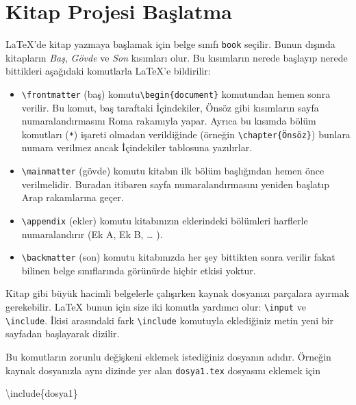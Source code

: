 \documentclass[
  10pt,
]{scrbook}
\newenvironment{Shaded}{}{}
\newcommand{\BuiltInTok}[1]{#1}
\newcommand{\ExtensionTok}[1]{#1}
\newcommand{\NormalTok}[1]{#1}
\providecommand{\tightlist}{%
  \setlength{\itemsep}{0pt}\setlength{\parskip}{0pt}}
\theoremstyle{definition}
\theoremstyle{definition}
\theoremstyle{definition}
\theoremstyle{definition}
\theoremstyle{remark}
\begin{document}
\hypertarget{kitap-projesi-baux15flatma}{%
\section{Kitap Projesi Başlatma}\label{kitap-projesi-baux15flatma}}

LaTeX'de kitap yazmaya başlamak için belge sınıfı \texttt{book} seçilir. Bunun dışında kitapların \emph{Baş}, \emph{Gövde} ve \emph{Son} kısımları olur. Bu kısımların nerede başlayıp nerede bittikleri aşağıdaki komutlarla LaTeX'e bildirilir:

\begin{itemize}
\tightlist
\item
  \texttt{\textbackslash{}frontmatter} (baş) komutu\texttt{\textbackslash{}begin\{document\}} komutundan hemen sonra verilir. Bu komut, baş taraftaki İçindekiler, Önsöz gibi kısımların sayfa numaralandırmasını Roma rakamıyla yapar. Ayrıca bu kısımda bölüm komutları (\texttt{*}) işareti olmadan verildiğinde (örneğin \texttt{\textbackslash{}chapter\{Önsöz\}}) bunlara numara verilmez ancak İçindekiler tablosuna yazılırlar.
\item
  \texttt{\textbackslash{}mainmatter} (gövde) komutu kitabın ilk bölüm başlığından hemen önce verilmelidir. Buradan itibaren sayfa numaralandırmasını yeniden başlatıp Arap rakamlarına geçer.
\item
  \texttt{\textbackslash{}appendix} (ekler) komutu kitabınızın eklerindeki bölümleri harflerle numaralandırır (Ek A, Ek B, \ldots{} ).
\item
  \texttt{\textbackslash{}backmatter} (son) komutu kitabınızda her şey bittikten sonra verilir fakat bilinen belge sınıflarında görünürde hiçbir etkisi yoktur.
\end{itemize}

Kitap gibi büyük hacimli belgelerle çalışırken kaynak dosyanızı parçalara ayırmak gerekebilir. LaTeX bunun için size iki komutla yardımcı olur: \texttt{\textbackslash{}input} ve \texttt{\textbackslash{}include}. İkisi arasındaki fark \texttt{\textbackslash{}include} komutuyla eklediğiniz metin yeni bir sayfadan başlayarak dizilir.

Bu komutların zorunlu değişkeni eklemek istediğiniz dosyanın adıdır. Örneğin kaynak dosyanızla aynı dizinde yer alan \texttt{dosya1.tex} dosyasını eklemek için

\begin{Shaded}
\begin{Highlighting}[]
\BuiltInTok{\textbackslash{}include}\NormalTok{\{}\ExtensionTok{dosya1}\NormalTok{\}}
\end{Highlighting}
\end{Shaded}
\end{document}
